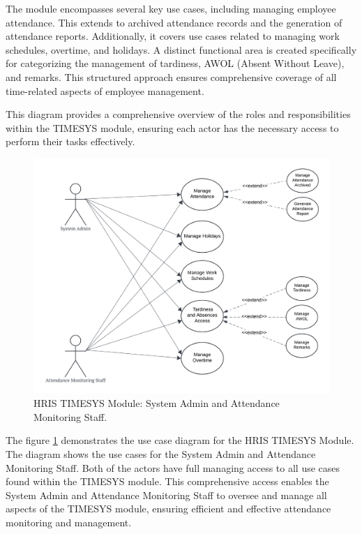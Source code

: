     The module encompasses several key use cases, including managing employee attendance. This extends to archived attendance records and the generation of attendance reports. Additionally, it covers use cases related to managing work schedules, overtime, and holidays. A distinct functional area is created specifically for categorizing the management of tardiness, AWOL (Absent Without Leave), and remarks. This structured approach ensures comprehensive coverage of all time-related aspects of employee management.

    This diagram provides a comprehensive overview of the roles and responsibilities within the TIMESYS module, ensuring each actor has the necessary access to perform their tasks effectively.
    
    \begin{figure}[H]
        \centering
        \includegraphics[width=0.9\linewidth]{figures/images/diagrams/usecase/use-case-time-1.png}
        \caption{HRIS TIMESYS Module: System Admin and Attendance Monitoring Staff.}
        \label{fig:use-case-time-1}
    \end{figure}

    The figure \ref{fig:use-case-time-1} demonstrates the use case diagram for the HRIS TIMESYS Module. The diagram shows the use cases for the System Admin and Attendance Monitoring Staff. Both of the actors have full managing access to all use cases found within the TIMESYS module. This comprehensive access enables the System Admin and Attendance Monitoring Staff to oversee and manage all aspects of the TIMESYS module, ensuring efficient and effective attendance monitoring and management.

